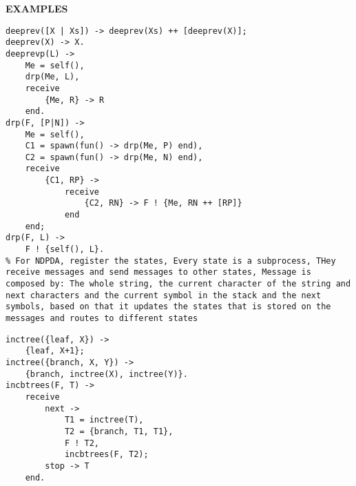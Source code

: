 \documentclass{article}
\begin{document}
\begin{multicols*}{3}
\hrulefill

\textbf{EXAMPLES}
\begin{lstlisting}
deeprev([X | Xs]) -> deeprev(Xs) ++ [deeprev(X)];
deeprev(X) -> X.
deeprevp(L) ->
    Me = self(),
    drp(Me, L),
    receive
        {Me, R} -> R
    end.
drp(F, [P|N]) ->
    Me = self(),
    C1 = spawn(fun() -> drp(Me, P) end),
    C2 = spawn(fun() -> drp(Me, N) end),
    receive
        {C1, RP} ->
            receive
                {C2, RN} -> F ! {Me, RN ++ [RP]}
            end
    end;
drp(F, L) ->
    F ! {self(), L}.
% For NDPDA, register the states, Every state is a subprocess, THey receive messages and send messages to other states, Message is composed by: The whole string, the current character of the string and next characters and the current symbol in the stack and the next symbols, based on that it updates the states that is stored on the messages and routes to different states
\end{lstlisting}
\hrulefill
\begin{lstlisting}
inctree({leaf, X}) ->
    {leaf, X+1};
inctree({branch, X, Y}) ->
    {branch, inctree(X), inctree(Y)}.
incbtrees(F, T) ->
    receive
        next ->
            T1 = inctree(T),
            T2 = {branch, T1, T1},
            F ! T2,
            incbtrees(F, T2);
        stop -> T
    end.
\end{lstlisting}
\hrulefill
\begin{lstlisting}

\end{lstlisting}
\end{multicols*}
\end{document}
